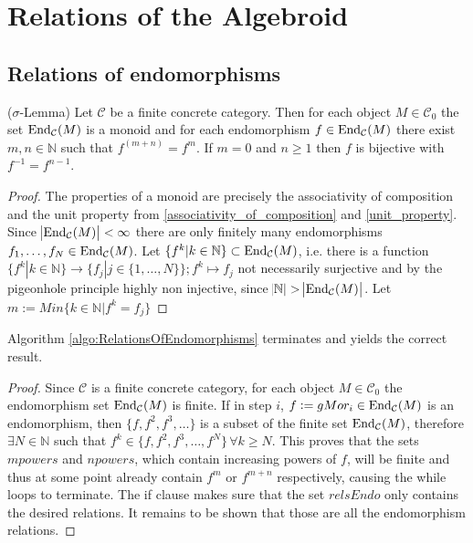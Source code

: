 
\section{Relations of the Algebroid}

\subsection{Relations of endomorphisms}


\begin{lemma}{($\sigma$-Lemma)}
Let $\mathcal{C}$ be a finite concrete category. Then for each object $M \in \mathcal{C}_{0}$ the set
$\textup{End}_{\mathcal{C}}(M)$ is a monoid and for each endomorphism $f \in \textup{End}_{\mathcal{C}}(M)$
there exist $m,n \in \mathbb{N}$ such that $f^{(m+n)}=f^{m}$. If $m = 0$ and $n \geq 1$ then $f$ is bijective with $f^{-1} = f^{n-1}$.
\begin{proof}
The properties of a monoid are precisely the associativity of composition and the unit property from \ref{associativity_of_composition} and \ref{unit_property}.
Since $\abs{\textup{End}_{\mathcal{C}}(M)}<\infty$ there are only finitely many endomorphisms $f_{1},\dots, f_{N} \in \textup{End}_{\mathcal{C}}(M)$.
Let $\{f^{k} | k \in \mathbb{N} \} \subset \textup{End}_{\mathcal{C}}(M)$, i.e. there is a function 
$\{f^{k} | k \in \mathbb{N}\} \rightarrow \{f_{j} | j \in \{1,\dots,N\}\}; f^{k} \mapsto f_{j}$ not necessarily surjective and 
by the pigeonhole principle highly non injective, since $\abs{\mathbb{N}}>\abs{\textup{End}_{\mathcal{C}}(M)}$.
Let $m := Min \{ k \in \mathbb{N}| f^{k} =  f_{j} \}$

\begin{minipage}{.45\textwidth}\phantom{}\end{minipage}
\end{proof}
\end{lemma}

\begin{lemma}
Algorithm \ref{algo:RelationsOfEndomorphisms} terminates and yields the correct result.
\begin{proof}
Since $\mathcal{C}$ is a finite concrete category, for each object $M \in \mathcal{C}_{0}$ the endomorphism set
$\textup{End}_{\mathcal{C}}(M)$ is finite. If in step $i$, $f := gMor_{i} \in \textup{End}_{\mathcal{C}}(M)$ is an endomorphism,
then $\{f, f^{2}, f^{3}, \dots\}$ is a subset of the finite set $\textup{End}_{\mathcal{C}}(M)$, therefore $\exists N \in \mathbb{N}$ such that
$f^{k} \in \{f, f^{2}, f^{3}, \dots, f^{N}\} \, \forall k \geq N$.
This proves that the sets $mpowers$ and $npowers$, which contain increasing powers of $f$, will be finite and thus at some point
already contain $f^{m}$ or $f^{m+n}$ respectively, causing the while loops to terminate.
The if clause makes sure that the set $relsEndo$ only contains the desired relations. It remains to be shown that those are all
the endomorphism relations.
\end{proof}
\end{lemma}

